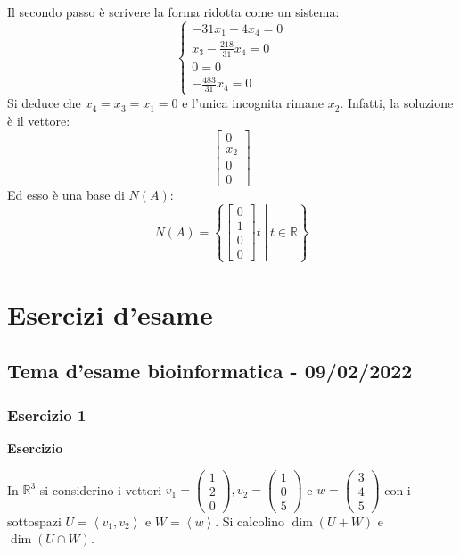 \documentclass[a4paper]{article}
\begin{document}
	Il \textcolor{Red3}{secondo passo} è scrivere la forma ridotta come un sistema:
	\begin{equation*}
		\begin{cases}
			-31x_{1} + 4x_{4} = 0 \\
			x_{3} -\frac{218}{31} x_{4} = 0 \\
			0 = 0 \\
			-\frac{483}{31}x_{4} = 0
		\end{cases}
	\end{equation*}
	Si deduce che $x_{4} = x_{3} = x_{1} = 0$ e l'unica incognita rimane $x_{2}$. Infatti, la soluzione è il vettore:
	\begin{equation*}
		\begin{bmatrix}
			0 \\
			x_{2} \\
			0 \\
			0
		\end{bmatrix}
	\end{equation*}
	Ed esso è una base di $N\left(A\right)$:
	\begin{equation*}
		N\left(A\right) = \left\{\left.\begin{bmatrix}
			0 \\
			1 \\
			0 \\
			0
		\end{bmatrix} t \: \right| \: t \in \mathbb{R} \right\}
	\end{equation*}\newpage

	\section{Esercizi d'esame}
	
	\subsection{Tema d'esame bioinformatica - 09/02/2022}
	
	\subsubsection{Esercizio 1}
	
	\textcolor{Red3}{\textbf{Esercizio}}\newline
	
	\noindent
	In $\mathbb{R}^{3}$ si considerino i vettori $v_{1} = \begin{pmatrix}
		1 \\
		2 \\
		0
	\end{pmatrix}, v_{2} = \begin{pmatrix}
		1 \\
		0 \\
		5
	\end{pmatrix}$ e $w = \begin{pmatrix}
		3 \\
		4 \\
		5
	\end{pmatrix}$ con i sottospazi $U = \left\langle v_{1}, v_{2} \right\rangle$ e $W = \left\langle w \right\rangle$. Si calcolino $\dim\left(U+W\right)$ e $\dim\left(U \cap W\right)$.\newline
\end{document}
